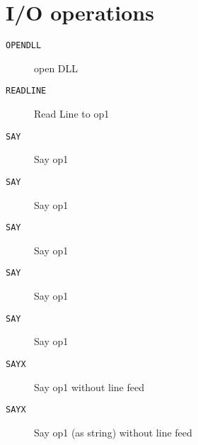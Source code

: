 \section{I/O operations}
\begin{description}
\item[\texttt{OPENDLL}]  open DLL\\

\end{description}
\begin{description}
\item[\texttt{READLINE}]  Read Line to op1\\

\end{description}
\begin{description}
\item[\texttt{SAY}]  Say op1\\

\end{description}
\begin{description}
\item[\texttt{SAY}]  Say op1\\

\end{description}
\begin{description}
\item[\texttt{SAY}]  Say op1\\

\end{description}
\begin{description}
\item[\texttt{SAY}]  Say op1\\

\end{description}
\begin{description}
\item[\texttt{SAY}]  Say op1\\

\end{description}
\begin{description}
\item[\texttt{SAYX}]  Say op1 without line feed\\

\end{description}
\begin{description}
\item[\texttt{SAYX}]  Say op1 (as string) without line feed\\

\end{description}
